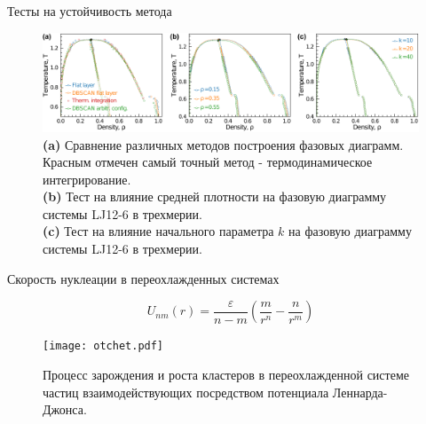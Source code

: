 \documentclass{beamer}
\begin{document}
\begin{frame}{Тесты на устойчивость метода}
\footnotesize{
\begin{figure}[!t]
    \centering
    \includegraphics[width=\linewidth]{Figure10.pdf}
    \caption{\textbf{(a)} Сравнение различных методов построения фазовых диаграмм. Красным отмечен самый точный метод - термодинамическое интегрирование.\\
             \textbf{(b)} Тест на влияние средней плотности на фазовую диаграмму системы LJ12-6 в трехмерии.\\
             \textbf{(c)} Тест на влияние начального параметра $k$ на фазовую диаграмму системы LJ12-6 в трехмерии.}
    \label{tests}
\end{figure}
}

\end{frame}






\begin{frame}{Скорость нуклеации в переохлажденных системах}
\footnotesize{

\begin{equation}
U_{nm}(r)=\frac{\varepsilon}{n-m}\left(\frac{m}{r^n}-\frac{n}{r^m}\right) \label{NMP-eq1}
\end{equation}

\begin{figure}[!t]
	 \centering
	 \texttt{[image: otchet.pdf]}
	 \caption{Процесс зарождения и роста кластеров в переохлажденной системе частиц взаимодействующих посредством потенциала Леннарда-Джонса.}
	 \label{otchet}
\end{figure}

}

\end{frame}
\end{document}
